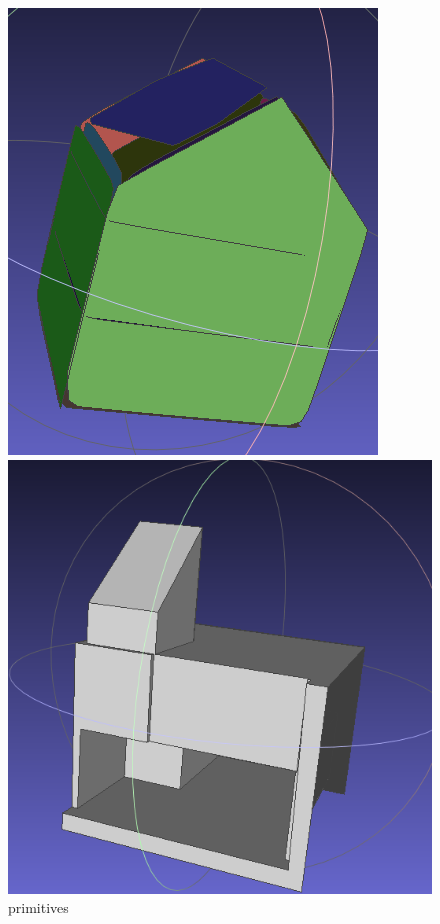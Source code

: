 \documentclass{article}
\begin{document}
\begin{figure}[H]
\begin{minipage}[t]{0.29\textwidth}
    \includegraphics[width=\textwidth]{../../images/screen_kinetic/ACJasmin_primitive_cgal.png}
    \caption*{primitives}
  \end{minipage}
  \hspace{0.05\textwidth}
  \begin{minipage}[t]{0.27\textwidth}
    \includegraphics[width=\textwidth]{../../images/screen_kinetic/ACJasmin_result_CGAL.png}

\end{minipage}
\end{figure}
\end{document}
